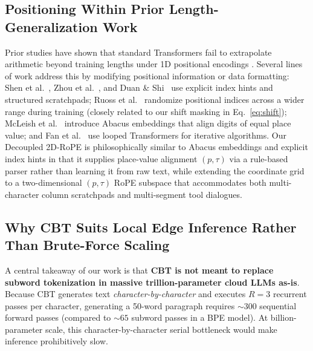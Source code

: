 \documentclass[10pt,twocolumn]{article}
\begin{document}
\subsection{Positioning Within Prior Length-Generalization Work}
Prior studies have shown that standard Transformers fail to extrapolate arithmetic beyond training lengths under 1D positional encodings \cite{nogueira2021investigating,jelassi2023length,dziri2023faith,kazemnejad2023impact}. Several lines of work address this by modifying positional information or data formatting: Shen et al.~\cite{shen2023positional}, Zhou et al.~\cite{zhou2024transformers}, and Duan \& Shi~\cite{duan2023interpolation} use explicit index hints and structured scratchpads; Ruoss et al.~\cite{ruoss2023randomized} randomize positional indices across a wider range during training (closely related to our shift masking in Eq.~\ref{eq:shift}); McLeish et al.~\cite{mcleish2024transformers} introduce Abacus embeddings that align digits of equal place value; and Fan et al.~\cite{fan2024looped} use looped Transformers for iterative algorithms. Our Decoupled 2D-RoPE is philosophically similar to Abacus embeddings and explicit index hints in that it supplies place-value alignment $(p, \tau)$ via a rule-based parser rather than learning it from raw text, while extending the coordinate grid to a two-dimensional $(p, \tau)$ RoPE subspace that accommodates both multi-character column scratchpads and multi-segment tool dialogues.

\subsection{Why CBT Suits Local Edge Inference Rather Than Brute-Force Scaling}
A central takeaway of our work is that \textbf{CBT is not meant to replace subword tokenization in massive trillion-parameter cloud LLMs as-is}. Because CBT generates text \emph{character-by-character} and executes $R=3$ recurrent passes per character, generating a 50-word paragraph requires $\sim 300$ sequential forward passes (compared to $\sim 65$ subword passes in a BPE model). At billion-parameter scale, this character-by-character serial bottleneck would make inference prohibitively slow.
\end{document}
